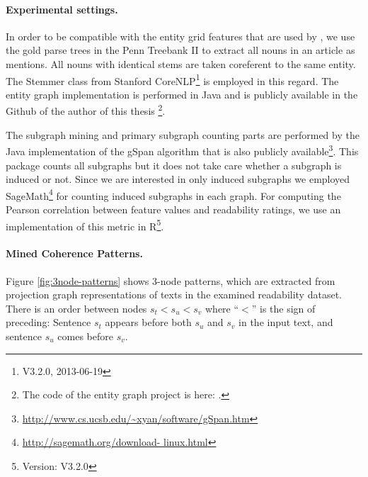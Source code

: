 \paragraph{Experimental settings.} 
In order to be compatible with the entity grid features that are used by , we use the gold parse trees in the Penn Treebank II \cite{marcus94} to extract all nouns in an article as mentions. 
All nouns with identical stems are taken coreferent to the same entity. 
The Stemmer class from Stanford CoreNLP\footnote{V3.2.0, 2013-06-19} is employed in this regard.  
The entity graph implementation is performed in Java and is publicly available in the Github of the author of this thesis
\footnote{The code of the entity graph project is here: \url{}.}. 

The subgraph mining and primary subgraph counting parts are performed by the Java implementation of the gSpan algorithm that is also publicly available\footnote{\url{http://www.cs.ucsb.edu/~xyan/software/gSpan.htm}}. 
This package counts all subgraphs but it does not take care whether a subgraph is induced or not. 
Since we are interested in only induced subgraphs we employed SageMath\footnote{\url{http://sagemath.org/download- linux.html}} for counting induced subgraphs in each graph.  
For computing the Pearson correlation between feature values and readability ratings, we use an implementation of this metric in R\footnote{Version: V3.2.0}. 

\paragraph{Mined Coherence Patterns.} 
Figure \ref{fig:3node-patterns} shows 3-node patterns, which are extracted from projection graph representations of texts in the examined readability dataset. 
There is an order between nodes $s_t < s_u < s_v$ where ``$<$'' is the sign of preceding: Sentence $s_t$ appears before both $s_u$ and $s_v$ in the input text, and sentence $s_u$ comes before $s_v$. 

